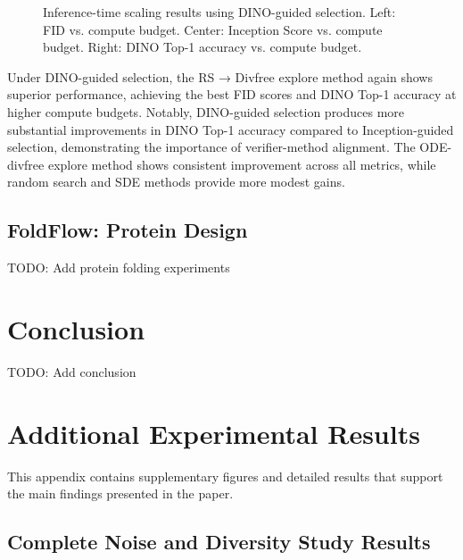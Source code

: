 \documentclass{article}
\begin{document}
\begin{figure}[H]
\begin{minipage}{0.32\textwidth}
  \end{minipage}
  \caption{Inference-time scaling results using DINO-guided selection. Left: FID vs. compute budget. Center: Inception Score vs. compute budget. Right: DINO Top-1 accuracy vs. compute budget.}
  \label{fig:dino-scaling}
\end{figure}

Under DINO-guided selection, the RS → Divfree explore method again shows superior performance, achieving the best FID scores and DINO Top-1 accuracy at higher compute budgets. Notably, DINO-guided selection produces more substantial improvements in DINO Top-1 accuracy compared to Inception-guided selection, demonstrating the importance of verifier-method alignment. The ODE-divfree explore method shows consistent improvement across all metrics, while random search and SDE methods provide more modest gains.

\subsection{FoldFlow: Protein Design}

TODO: Add protein folding experiments

\section{Conclusion}

TODO: Add conclusion





\appendix

\section{Additional Experimental Results}

This appendix contains supplementary figures and detailed results that support the main findings presented in the paper.

\subsection{Complete Noise and Diversity Study Results}
\end{document}

